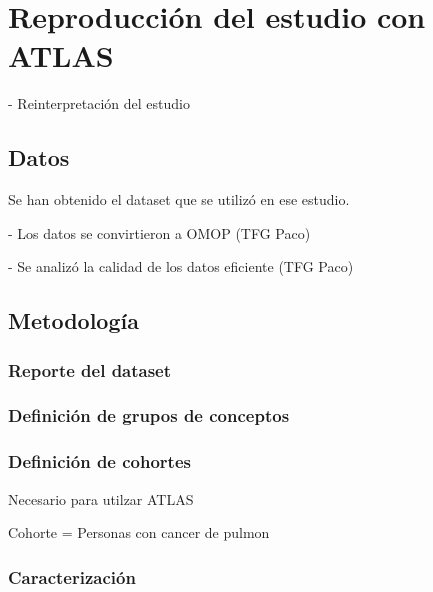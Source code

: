 \section{Reproducción del estudio con ATLAS} \label{sec:09atlas}


- Reinterpretación del estudio

\subsection{Datos}


Se han obtenido el dataset que se utilizó en ese estudio.

- Los datos se convirtieron a OMOP (TFG Paco)

- Se analizó la calidad de los datos eficiente (TFG Paco)

\subsection{Metodología}


\subsubsection{Reporte del dataset}

\subsubsection{Definición de grupos de conceptos}

\subsubsection{Definición de cohortes}

Necesario para utilzar ATLAS

Cohorte = Personas con cancer de pulmon

\subsubsection{Caracterización}

